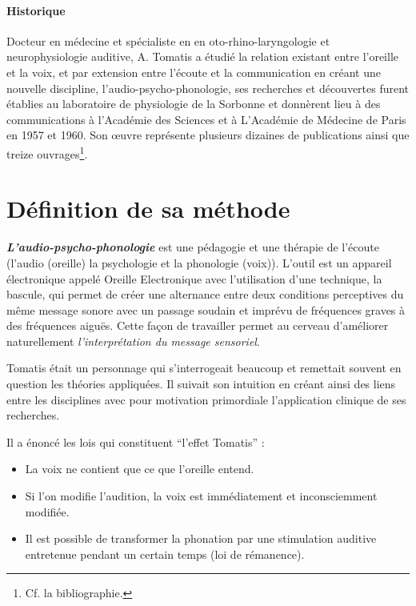 


\paragraph{Historique} 

Docteur en médecine et spécialiste en en oto-rhino-laryngologie et
neurophysiologie auditive, A. Tomatis a étudié la relation
existant entre l'oreille et la voix, et par extension entre l'écoute
et la communication en créant 
une nouvelle discipline, l'audio-psycho-phonologie, ses recherches et
découvertes furent établies au
laboratoire de physiologie de la Sorbonne et donnèrent lieu à des
communications à l'Académie des Sciences et à L'Académie de Médecine
de Paris en 1957 et 1960. Son \oe uvre représente plusieurs dizaines
de publications ainsi que treize ouvrages\footnote{Cf. la bibliographie.}.

\section{Définition de sa méthode} 

\emph\textbf{{L'audio-psycho-phonologie}}
est une pédagogie et une thérapie de l'écoute (l'audio (oreille) la psychologie et la phonologie (voix)).
 L'outil est un appareil électronique appelé
\label{outil_oreille_electro}
Oreille Electronique avec  l'utilisation d'une technique, la 
bascule, qui permet de créer une alternance entre deux conditions perceptives 
du même message sonore avec un passage soudain et imprévu de fréquences graves à des 
fréquences aiguës. Cette façon de travailler permet au
cerveau d'améliorer naturellement \emph{l'interprétation du message
sensoriel}.




Tomatis était un personnage qui s'interrogeait beaucoup  et remettait
souvent en question les théories appliquées. Il suivait son intuition
en créant ainsi 
des liens entre les disciplines avec pour motivation primordiale
l'application clinique de ses recherches. 

Il a énoncé les lois qui constituent ``l'effet Tomatis'' : 
\begin{itemize}
	\item La voix ne contient que ce que l'oreille entend.
	\item Si l'on modifie l'audition, la voix est immédiatement et 
inconsciemment
		modifiée.
	\item Il est possible de transformer la phonation par une stimulation 
auditive
		entretenue pendant un certain temps (loi de rémanence).
\end{itemize}

